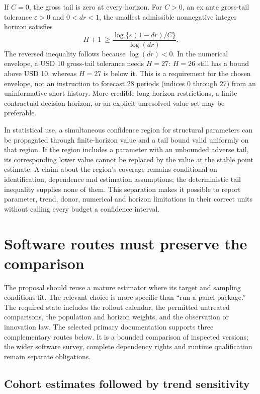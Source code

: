 If $C=0$, the gross tail is zero at every horizon. For $C>0$, an ex ante
gross-tail tolerance $\varepsilon>0$ and $0<dr<1$,
the smallest admissible nonnegative integer horizon satisfies
\begin{equation}
 H+1\ \geq
 \frac{\log\{\varepsilon(1-dr)/C\}}{\log(dr)}.
 \label{exec17:s6-horizon-budget}
\end{equation}
The reversed inequality follows because $\log(dr)<0$. In the numerical
envelope, a USD 10 gross-tail tolerance needs $H=27$: $H=26$
still has a bound above USD 10, whereas $H=27$ is below it.
This is a requirement for the chosen envelope, not an instruction to
forecast 28 periods (indices $0$ through $27$) from an uninformative short history. More credible
long-horizon restrictions, a finite contractual decision horizon, or
an explicit unresolved value set may be preferable.

In statistical use, a simultaneous confidence region for structural
parameters can be propagated through finite-horizon value and a tail
bound valid uniformly on that region. If the region includes a parameter
with an unbounded adverse tail, its corresponding lower value cannot
be replaced by the value at the stable point estimate. A claim about
the region's coverage remains conditional on identification, dependence
and estimation assumptions; the deterministic tail inequality supplies
none of them. This separation makes it possible to report parameter,
trend, donor, numerical and horizon limitations in their correct units
without calling every budget a confidence interval.

\section{Software routes must preserve the comparison}
\label{exec17:s6-software}

The proposal should reuse a mature estimator where its target and
sampling conditions fit. The relevant choice is more specific than
``run a panel package.'' The required state includes the rollout
calendar, the permitted untreated comparisons, the population and
horizon weights, and the observation or innovation law. The selected
primary documentation supports three complementary routes below.
It is a bounded comparison of inspected versions; the wider software
survey, complete dependency rights and runtime qualification remain
separate obligations.~\citep{exec17_s6_paths}

\subsection{Cohort estimates followed by trend sensitivity}

